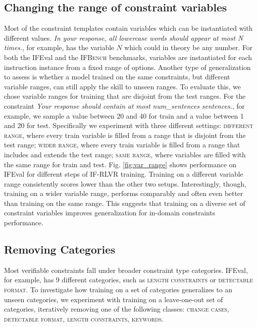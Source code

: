 \documentclass{article}
\newcommand{\benchname}{\textsc{IFBench}\xspace}
\begin{document}
\subsection{Changing the range of constraint variables}
Most of the constraint templates contain variables which can be instantiated with different values. \textit{In your response, all lowercase words should appear at most {N} times.}, for example, has the variable $N$ which could in theory be any number. For both the IFEval and the \benchname benchmarks, variables are instantiated for each instruction instance from a fixed range of options. Another type of generalization to assess is whether a model trained on the same constraints, but different variable ranges, can still apply the skill to unseen ranges. To evaluate this, we chose variable ranges for training that are disjoint from the test ranges. For the constraint \textit{Your response should contain at most {num\_sentences} sentences.}, for example, we sample a value between 20 and 40 for train and a value between 1 and 20 for test. Specifically we experiment with three different settings: \textsc{different range}, where every train variable is filled from a range that is disjoint from the test range; \textsc{wider range}, where every train variable is filled from a range that includes and extends the test range; \textsc{same range}, where variables are filled with the same range for train and test. Fig. \ref{fig:var_range} shows performance on IFEval for different steps of IF-RLVR training. Training on a different variable range consistently scores lower than the other two setups. Interestingly, though, training on a wider variable range, performs comparably and often even better than training on the same range. This suggests that training on a diverse set of constraint variables improves generalization for in-domain constraints performance.




\subsection{Removing Categories}
Most verifiable constraints fall under broader constraint type categories. IFEval, for example, has 9 different categories, such as \textsc{length constraints} or \textsc{detectable format}. To investigate how training on a set of categories generalizes to an unseen categories, we experiment with training on a leave-one-out set of categories, iteratively removing one of the following classes: \textsc{change cases}, \textsc{detectable format}, \textsc{length constraints}, \textsc{keywords}. 
\end{document}
